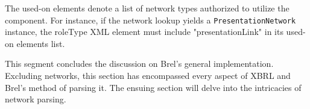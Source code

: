 The used-on elements denote a list of network types authorized to utilize the component.
For instance, if the network lookup yields a \texttt{PresentationNetwork} instance, the roleType XML element must include "presentationLink" in its used-on elements list.

This segment concludes the discussion on Brel's general implementation.
Excluding networks, this section has encompassed every aspect of XBRL and Brel's method of parsing it.
The ensuing section will delve into the intricacies of network parsing.





